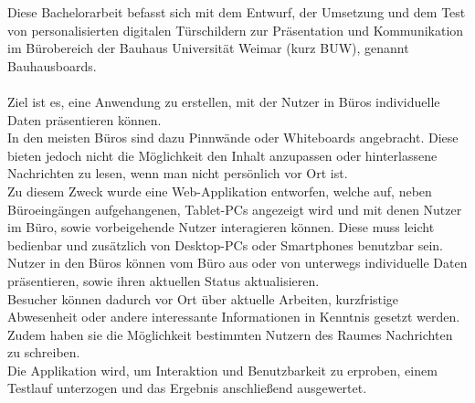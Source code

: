 Diese Bachelorarbeit befasst sich mit dem Entwurf, der Umsetzung und dem Test von personalisierten
digitalen Türschildern zur Präsentation und Kommunikation im Bürobereich der Bauhaus Universität Weimar (kurz BUW), genannt
Bauhausboards.\\\\
Ziel ist es, eine Anwendung zu erstellen, mit der Nutzer in Büros individuelle Daten präsentieren können.\\
In den meisten Büros sind dazu Pinnwände oder Whiteboards angebracht. Diese bieten jedoch nicht die Möglichkeit den Inhalt anzupassen oder hinterlassene Nachrichten zu lesen, wenn man nicht persönlich vor Ort ist.\\
Zu diesem Zweck wurde eine Web-Applikation entworfen, welche auf, neben Büroeingängen aufgehangenen, Tablet-PCs angezeigt wird und mit denen Nutzer im Büro, sowie vorbeigehende Nutzer interagieren können.
Diese muss leicht bedienbar und zusätzlich von Desktop-PCs oder Smartphones benutzbar sein.\\
Nutzer in den Büros können vom Büro aus oder von unterwegs individuelle Daten präsentieren, sowie ihren aktuellen Status aktualisieren.\\
Besucher können dadurch vor Ort über aktuelle Arbeiten, kurzfristige Abwesenheit oder andere interessante Informationen in Kenntnis gesetzt werden. Zudem haben sie die Möglichkeit bestimmten Nutzern des Raumes Nachrichten zu schreiben.\\
Die Applikation wird, um Interaktion und Benutzbarkeit zu erproben, einem Testlauf unterzogen und das Ergebnis anschließend ausgewertet.